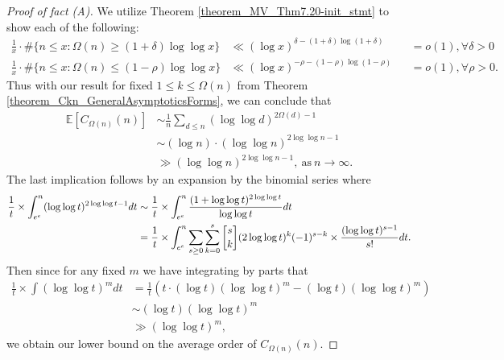 \documentclass[11pt,reqno,a4letter]{article}
\numberwithin{figure}{section}
\numberwithin{table}{section}
\newcommand{\gkpSI}[2]{\ensuremath{\genfrac{\lbrack}{\rbrack}{0pt}{}{#1}{#2}}}
\theoremstyle{plain}
\numberwithin{theorem}{section}
\theoremstyle{definition}
\begin{document}
\begin{proof}[Proof of fact (A)] 
We utilize Theorem \ref{theorem_MV_Thm7.20-init_stmt} 
to show each of the following: 
\begin{align*} 
\frac{1}{x} \cdot \#\{n \leq x: \Omega(n) \geq (1+\delta) \log\log x\} & \ll (\log x)^{\delta - (1+\delta)\log(1+\delta)} 
     && = o(1), \forall \delta > 0 \\ 
\frac{1}{x} \cdot \#\{n \leq x: \Omega(n) \leq (1-\rho) \log\log x\} & \ll (\log x)^{-\rho - (1-\rho)\log(1-\rho)} 
     && = o(1), \forall \rho > 0.   
\end{align*} 
Thus with our result for fixed $1 \leq k \leq \Omega(n)$ from 
Theorem \ref{theorem_Ckn_GeneralAsymptoticsForms}, 
we can conclude that 
\begin{align*} 
\mathbb{E}[C_{\Omega(n)}(n)] & \sim \frac{1}{n} \sum_{d \leq n} (\log\log d)^{2\Omega(d)-1} \\ 
     & \sim (\log n) \cdot (\log\log n)^{2\log\log n - 1} \\ 
     & \gg (\log\log n)^{2\log\log n - 1}, \mathrm{\ as\ } n \rightarrow \infty. 
\end{align*} 
The last implication follows by an expansion by the binomial series where 
\begin{align*} 
\frac{1}{t} \times \int_{e^e}^{n} (\log\log t)^{2\log\log t - 1} dt & \sim 
     \frac{1}{t} \times \int_{e^e}^{n} \frac{(1 + \log\log t)^{2\log\log t}}{\log\log t} dt \\ 
     & = \frac{1}{t} \times \int_{e^e}^{n} 
     \sum_{s \geq 0} \sum_{k=0}^{s} \gkpSI{s}{k} (2\log\log t)^{k} (-1)^{s-k} \times 
     \frac{(\log\log t)^{s-1}}{s!} dt. 
\end{align*} 
Then since for any fixed $m$ we have integrating by parts that 
\begin{align*} 
\frac{1}{t} \times \int (\log\log t)^m dt & = \frac{1}{t}\left( 
     t \cdot (\log t) (\log\log t)^m - (\log t) (\log\log t)^m\right) \\ 
     & \sim (\log t) (\log\log t)^m \\ 
     & \gg (\log\log t)^m, 
\end{align*} 
we obtain our lower bound on the average order of $C_{\Omega(n)}(n)$. 
\end{proof} 
\end{document}
